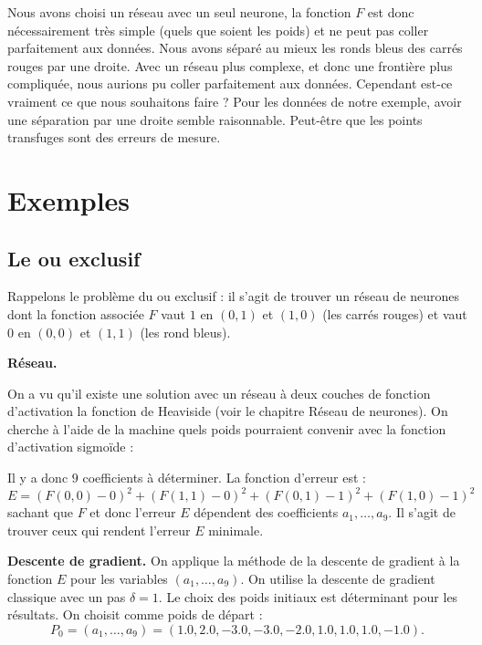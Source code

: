 \begin{exemple}{}{}
	
	Nous avons choisi un réseau avec un seul neurone, la fonction $F$ est donc nécessairement très simple (quels que soient les poids) et ne peut pas \og{}coller\fg{} parfaitement aux données. 
	Nous avons séparé au mieux les ronds bleus des carrés rouges par une droite. Avec un réseau plus complexe, et donc une frontière plus compliquée, nous aurions pu \og{}coller\fg{} parfaitement aux données. Cependant est-ce vraiment ce que nous souhaitons faire ? Pour les données de notre exemple, avoir une séparation par une droite semble raisonnable. Peut-être que les points transfuges sont des erreurs de mesure.
	
\end{exemple}


\section{Exemples}

\subsection{Le \og{}ou exclusif\fg{}}

Rappelons le problème du \og{}ou exclusif\fg{} : il s'agit de trouver un réseau de neurones dont la fonction associée $F$ vaut $1$ en $(0,1)$ et $(1,0)$ (les carrés rouges) et vaut $0$ en $(0,0)$ et $(1,1)$ (les rond bleus).


\textbf{Réseau.}

On a vu qu'il existe une solution avec un réseau à deux couches de fonction d'activation la fonction de Heaviside (voir le chapitre \og{}Réseau de neurones\fg{}).
On cherche à l'aide de la machine quels poids pourraient convenir avec la fonction d'activation sigmoïde :

Il y a donc $9$ coefficients à déterminer.
La fonction d'erreur est :
$$E = (F(0,0) - 0)^2 + (F(1,1) - 0)^2 + (F(0,1)-1)^2 + (F(1,0) - 1)^2$$
sachant que $F$ et donc l'erreur $E$ dépendent des coefficients $a_1,\ldots,a_9$.
Il s'agit de trouver ceux qui rendent l'erreur $E$ minimale.

\bigskip

\textbf{Descente de gradient.}
On applique la méthode de la descente de gradient à la fonction $E$ pour les variables $(a_1,\ldots,a_9)$.
On utilise la descente de gradient classique avec un pas $\delta = 1$. 
Le choix des poids initiaux est déterminant pour les résultats.
On choisit comme poids de départ :
$$P_0 = (a_1,\ldots,a_9) = (1.0, 2.0, -3.0, -3.0, -2.0, 1.0, 1.0, 1.0, -1.0).$$


